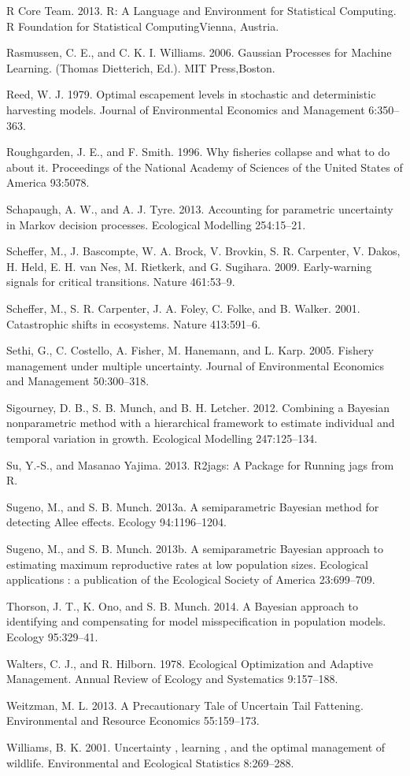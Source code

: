 \documentclass[author-year, 12pt,review]{components/elsarticle} %
\begin{document}
R Core Team. 2013. R: A Language and Environment for Statistical
Computing. R Foundation for Statistical ComputingVienna, Austria.

Rasmussen, C. E., and C. K. I. Williams. 2006. Gaussian Processes for
Machine Learning. (Thomas Dietterich, Ed.). MIT Press,Boston.

Reed, W. J. 1979. Optimal escapement levels in stochastic and
deterministic harvesting models. Journal of Environmental Economics and
Management 6:350--363.

Roughgarden, J. E., and F. Smith. 1996. Why fisheries collapse and what
to do about it. Proceedings of the National Academy of Sciences of the
United States of America 93:5078.

Schapaugh, A. W., and A. J. Tyre. 2013. Accounting for parametric
uncertainty in Markov decision processes. Ecological Modelling
254:15--21.

Scheffer, M., J. Bascompte, W. A. Brock, V. Brovkin, S. R. Carpenter, V.
Dakos, H. Held, E. H. van Nes, M. Rietkerk, and G. Sugihara. 2009.
Early-warning signals for critical transitions. Nature 461:53--9.

Scheffer, M., S. R. Carpenter, J. A. Foley, C. Folke, and B. Walker.
2001. Catastrophic shifts in ecosystems. Nature 413:591--6.

Sethi, G., C. Costello, A. Fisher, M. Hanemann, and L. Karp. 2005.
Fishery management under multiple uncertainty. Journal of Environmental
Economics and Management 50:300--318.

Sigourney, D. B., S. B. Munch, and B. H. Letcher. 2012. Combining a
Bayesian nonparametric method with a hierarchical framework to estimate
individual and temporal variation in growth. Ecological Modelling
247:125--134.

Su, Y.-S., and Masanao Yajima. 2013. R2jags: A Package for Running jags
from R.

Sugeno, M., and S. B. Munch. 2013a. A semiparametric Bayesian method for
detecting Allee effects. Ecology 94:1196--1204.

Sugeno, M., and S. B. Munch. 2013b. A semiparametric Bayesian approach
to estimating maximum reproductive rates at low population sizes.
Ecological applications : a publication of the Ecological Society of
America 23:699--709.

Thorson, J. T., K. Ono, and S. B. Munch. 2014. A Bayesian approach to
identifying and compensating for model misspecification in population
models. Ecology 95:329--41.

Walters, C. J., and R. Hilborn. 1978. Ecological Optimization and
Adaptive Management. Annual Review of Ecology and Systematics
9:157--188.

Weitzman, M. L. 2013. A Precautionary Tale of Uncertain Tail Fattening.
Environmental and Resource Economics 55:159--173.

Williams, B. K. 2001. Uncertainty , learning , and the optimal
management of wildlife. Environmental and Ecological Statistics
8:269--288.
\end{document}

